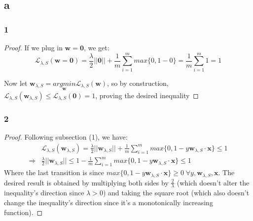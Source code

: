 \subsection*{a}
\subsubsection*{1}
\begin{proof}    
    If we plug in $\boldsymbol{w}=\boldsymbol{0}$, we get:
    \begin{equation*}
        \mathcal{L}_{\lambda, S}(\boldsymbol{w=0}) = \frac{\lambda}{2}||\boldsymbol{0}|| 
        + \frac{1}{m} \sum_{i=1}^{m} max\{0, 1-0\} = \frac{1}{m} \sum_{i=1}^{m} 1 = 1
    \end{equation*}
    
    Now let $\boldsymbol{w}_{\lambda, S} = \underset{\boldsymbol{w}}{argmin} \mathcal{L}_{\lambda, S}(\boldsymbol{w})$, so by construction, $\mathcal{L}_{\lambda, S}(\boldsymbol{w}_{\lambda, S}) \leq \mathcal{L}_{\lambda, S}(\boldsymbol{0}) = 1$, proving the desired inequality
\end{proof}

\subsubsection*{2}
\begin{proof}
    Following subsection (1), we have:
    \begin{equation*}
        \begin{split}            
            & \mathcal{L}_{\lambda, S}(\boldsymbol{w}_{\lambda, S}) = \frac{\lambda}{2}||\boldsymbol{w}_{\lambda, S}|| 
            + \frac{1}{m} \sum_{i=1}^{m} max\{0, 1-y \boldsymbol{w}_{\lambda, S} \cdot \boldsymbol{x}\} \leq 1 \\
            \Rightarrow & \frac{\lambda}{2}||\boldsymbol{w}_{\lambda, S}|| \leq 1 - \frac{1}{m} \sum_{i=1}^{m} max\{0, 1-y \boldsymbol{w}_{\lambda, S} \cdot \boldsymbol{x}\} \leq 1
        \end{split}
    \end{equation*}
    Where the last transition is since $max\{0, 1-y \boldsymbol{w}_{\lambda, S} \cdot \boldsymbol{x}\} \geq 0 \; \forall y, \boldsymbol{w}_{\lambda, S}, \boldsymbol{x}$. The desired result is obtained by multiplying both sides by $\frac{2}{\lambda}$ (which doesn't alter the inequality's direction since $\lambda > 0$) and taking the square root (which also doesn't change the inequality's direction since it's a monotonically increasing function).
\end{proof}

